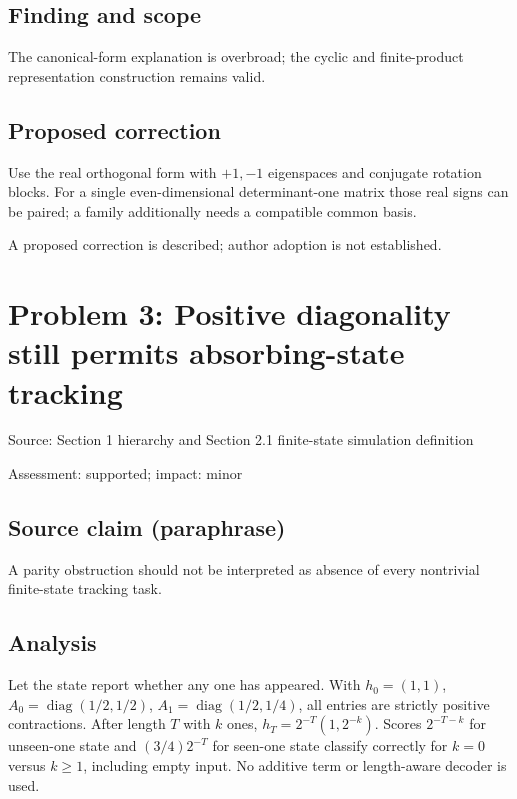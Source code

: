\documentclass[11pt]{article}
\begin{document}
\subsection*{Finding and scope}

The canonical-form explanation is overbroad; the cyclic and finite-product representation construction remains valid.

\subsection*{Proposed correction}

Use the real orthogonal form with \(+1,-1\) eigenspaces and conjugate rotation blocks. For a single even-dimensional determinant-one matrix those real signs can be paired; a family additionally needs a compatible common basis.

A proposed correction is described; author adoption is not established.

\section*{Problem 3: Positive diagonality still permits absorbing-state tracking}

Source: Section 1 hierarchy and Section 2.1 finite-state simulation definition

Assessment: supported; impact: minor

\subsection*{Source claim (paraphrase)}

A parity obstruction should not be interpreted as absence of every nontrivial finite-state tracking task.

\subsection*{Analysis}

Let the state report whether any one has appeared. With \(h_0=(1,1)\), \(A_0=\operatorname{diag}(1/2,1/2)\), \(A_1=\operatorname{diag}(1/2,1/4)\), all entries are strictly positive contractions. After length \(T\) with \(k\) ones, \(h_T=2^{-T}(1,2^{-k})\). Scores \(2^{-T-k}\) for unseen-one state and \((3/4)2^{-T}\) for seen-one state classify correctly for \(k=0\) versus \(k\ge1\), including empty input. No additive term or length-aware decoder is used.
\end{document}

